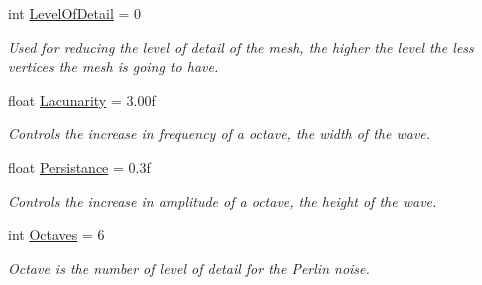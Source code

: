 \begin{DoxyCompactItemize}
\mbox{\label{class_assets_1_1_scripts_1_1_mesh_generation_a9b11bbcd0bdb8aa5a40aab130ad8568a}} 
int \mbox{\hyperlink{class_assets_1_1_scripts_1_1_mesh_generation_a9b11bbcd0bdb8aa5a40aab130ad8568a}{Level\+Of\+Detail}} = 0
\begin{DoxyCompactList}\small\item\em Used for reducing the level of detail of the mesh, the higher the level the less vertices the mesh is going to have. \end{DoxyCompactList}\item 
\mbox{\label{class_assets_1_1_scripts_1_1_mesh_generation_ab4466d8c419c1faaf0b8ea3795bed32c}} 
float \mbox{\hyperlink{class_assets_1_1_scripts_1_1_mesh_generation_ab4466d8c419c1faaf0b8ea3795bed32c}{Lacunarity}} = 3.\+00f
\begin{DoxyCompactList}\small\item\em Controls the increase in frequency of a octave, the width of the wave. \end{DoxyCompactList}\item 
\mbox{\label{class_assets_1_1_scripts_1_1_mesh_generation_acf5362f1f2349a17c23fedf79d591ea4}} 
float \mbox{\hyperlink{class_assets_1_1_scripts_1_1_mesh_generation_acf5362f1f2349a17c23fedf79d591ea4}{Persistance}} = 0.\+3f
\begin{DoxyCompactList}\small\item\em Controls the increase in amplitude of a octave, the height of the wave. \end{DoxyCompactList}\item 
\mbox{\label{class_assets_1_1_scripts_1_1_mesh_generation_a97778c77f402e6a70e11224da63b5697}} 
int \mbox{\hyperlink{class_assets_1_1_scripts_1_1_mesh_generation_a97778c77f402e6a70e11224da63b5697}{Octaves}} = 6
\begin{DoxyCompactList}\small\item\em Octave is the number of level of detail for the Perlin noise. \end{DoxyCompactList}\item 
\mbox{\label{class_assets_1_1_scripts_1_1_mesh_generation_a20721d365a32b079f8731c4a60452265}} 

\end{DoxyCompactItemize}
